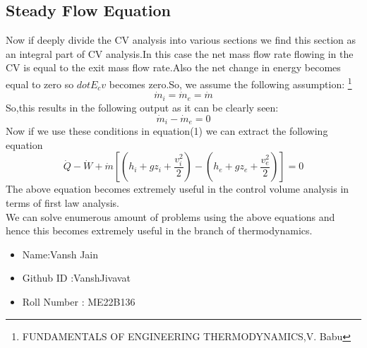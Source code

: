 \subsection{Steady Flow Equation}
Now if deeply divide the CV analysis into various sections we find this section as an integral part of CV analysis.In this case the net mass flow rate flowing in the CV is equal to the exit mass flow rate.Also the net change in energy becomes equal to zero so $dot E_cv$ becomes zero.So, we assume the following assumption:
\footnote{FUNDAMENTALS OF ENGINEERING THERMODYNAMICS,V. Babu}
\begin{equation}
    \dot m_i = \dot m_e = \dot m 
\end{equation}
So,this results in the following output as it can be clearly seen:
\begin{equation}
    \dot m_i - \dot m_e = 0
\end{equation}
Now if we use these conditions in equation(1) we can extract the following equation
\begin{equation}   
    \dot Q - \dot W + \dot m[(h_i + gz_i + \frac{v_i^2}{2})-(h_e + gz_e + \frac{v_e^2}{2})] =0
\end{equation}
The above equation becomes extremely useful in the control volume analysis in terms of first law analysis.\\
We can solve enumerous amount of problems using the above equations and hence this becomes extremely useful in the branch of thermodynamics.
\begin{itemize}
    \item Name:Vansh Jain
    \item Github ID :VanshJivavat
    \item Roll Number : ME22B136
\end{itemize}

